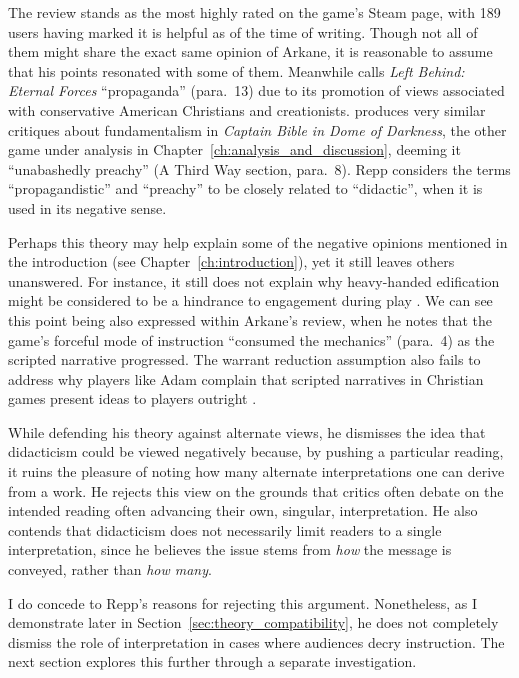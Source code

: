 The review stands as the most highly rated on the game's Steam page, with 189 users having marked it is helpful as of the time of writing. Though not all of them might share the exact same opinion of Arkane, it is reasonable to assume that his points resonated with some of them. Meanwhile \textcite{hartgrove_why_2022} calls \textit{Left Behind: Eternal Forces} \parencite{inspired_media_entertainment_left_2006} ``propaganda'' (para.~13) due to its promotion of views associated with conservative American Christians and creationists. \textcite{censorious_idler_captain_2018} produces very similar critiques about fundamentalism in \textit{Captain Bible in Dome of Darkness}, the other game under analysis in Chapter~\ref{ch:analysis_and_discussion}, deeming it ``unabashedly preachy'' (A Third Way section, para.~8). Repp considers the terms ``propagandistic'' and ``preachy'' to be closely related to ``didactic'', when it is used in its negative sense.


Perhaps this theory may help explain some of the negative opinions mentioned in the introduction (see Chapter~\ref{ch:introduction}), yet it still leaves others unanswered. For instance, it still does not explain why heavy-handed edification might be considered to be a hindrance to engagement during play \parencite{moon_channel_why_2023}. We can see this point being also expressed within Arkane's review, when he notes that the game's forceful mode of instruction ``consumed the mechanics'' (para.~4) as the scripted narrative progressed. The warrant reduction assumption also fails to address why players like Adam complain that scripted narratives in Christian games present ideas to players outright \parencite{games_and_groceries_podcast_problem_2020}.

While defending his theory against alternate views, he dismisses the idea that didacticism could be viewed negatively because, by pushing a particular reading, it ruins the pleasure of noting how many alternate interpretations one can derive from a work. He rejects this view on the grounds that critics often debate on the intended reading often advancing their own, singular, interpretation. He also contends that didacticism does not necessarily limit readers to a single interpretation, since he believes the issue stems from \textit{how} the message is conveyed, rather than \textit{how many}.

I do concede to Repp's reasons for rejecting this argument. Nonetheless, as I demonstrate later in Section~\ref{sec:theory_compatibility}, he does not completely dismiss the role of interpretation in cases where audiences decry instruction. The next section explores this further through a separate investigation.

